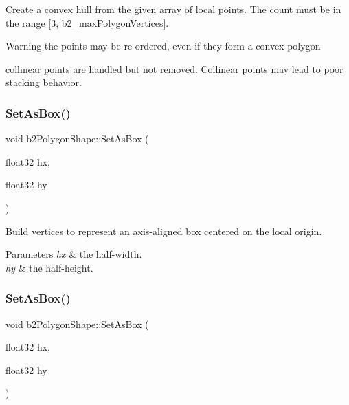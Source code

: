 Create a convex hull from the given array of local points. The count must be in the range \mbox{[}3, b2\+\_\+max\+Polygon\+Vertices\mbox{]}. \begin{DoxyWarning}{Warning}
the points may be re-\/ordered, even if they form a convex polygon 

collinear points are handled but not removed. Collinear points may lead to poor stacking behavior. 
\end{DoxyWarning}
\mbox{\label{classb2PolygonShape_a6bb90df8b4a40d1c53b64cc352a855dd}} 
\subsubsection{\texorpdfstring{Set\+As\+Box()}{SetAsBox()}\hspace{0.1cm}{\footnotesize\ttfamily [1/4]}}
{\footnotesize\ttfamily void b2\+Polygon\+Shape\+::\+Set\+As\+Box (\begin{DoxyParamCaption}\item[{float32}]{hx,  }\item[{float32}]{hy }\end{DoxyParamCaption})}

Build vertices to represent an axis-\/aligned box centered on the local origin. 
\begin{DoxyParams}{Parameters}
{\em hx} & the half-\/width. \\
\hline
{\em hy} & the half-\/height. \\
\hline
\end{DoxyParams}
\mbox{\label{classb2PolygonShape_a6bb90df8b4a40d1c53b64cc352a855dd}} 
\subsubsection{\texorpdfstring{Set\+As\+Box()}{SetAsBox()}\hspace{0.1cm}{\footnotesize\ttfamily [2/4]}}
{\footnotesize\ttfamily void b2\+Polygon\+Shape\+::\+Set\+As\+Box (\begin{DoxyParamCaption}\item[{float32}]{hx,  }\item[{float32}]{hy }\end{DoxyParamCaption})}

